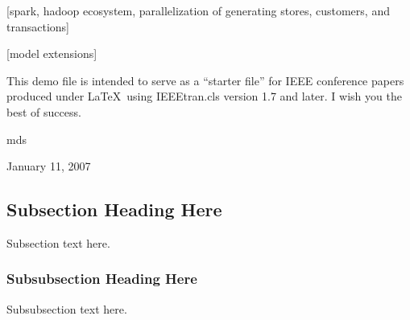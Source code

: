 \documentclass[conference]{IEEEtran}
\begin{document}
[spark, hadoop ecosystem, parallelization of generating stores, customers, and transactions]

[model extensions]


This demo file is intended to serve as a ``starter file''
for IEEE conference papers produced under \LaTeX\ using
IEEEtran.cls version 1.7 and later.
I wish you the best of success.

\hfill mds
 
\hfill January 11, 2007

\subsection{Subsection Heading Here}
Subsection text here.


\subsubsection{Subsubsection Heading Here}
Subsubsection text here.


%
%

\end{document}
